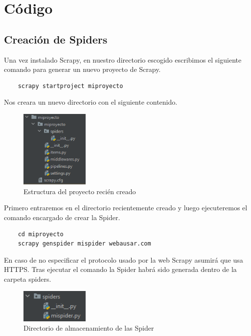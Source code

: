 \chapter[Código]{Código}
\label{Chap5}

\section{Creación de Spiders}
Una vez instalado Scrapy, en nuestro directorio escogido escribimos el siguiente comando para generar un nuevo proyecto de Scrapy.

\begin{verbatim}
	scrapy startproject miproyecto
\end{verbatim}

Nos creara un nuevo directorio con el siguiente contenido.

\begin{figure} [h!]
	\centering
	\includegraphics[width=0.3\textwidth]{fig/estructura_proyecto_scrapy.png}
	\caption[Estructura del proyecto recién creado]{Estructura del proyecto recién creado}
	\label{fig:ej11}
\end{figure}

Primero entraremos en el directorio recientemente creado y luego ejecuteremos el comando encargado de crear la Spider.

\begin{verbatim}
	cd miproyecto
	scrapy genspider mispider webausar.com
\end{verbatim}

En caso de no especificar el protocolo usado por la web Scrapy asumirá que usa HTTPS.\newline
\newline
Tras ejecutar el comando la Spider habrá sido generada dentro de la carpeta spiders.

\begin{figure} [h!]
	\centering
	\includegraphics[width=0.3\textwidth]{fig/primera_spider.png}
	\caption[Directorio de almacenamiento de las Spider]{Directorio de almacenamiento de las Spider}
	\label{fig:ej12}
\end{figure}

